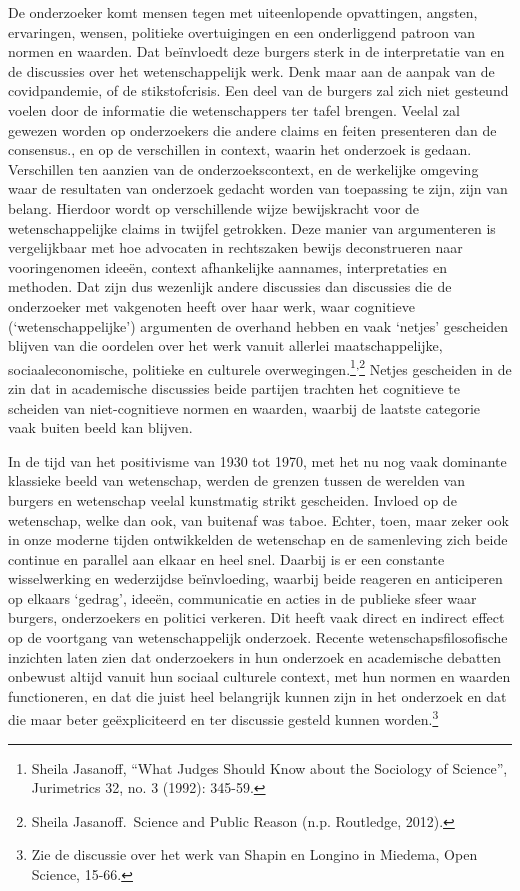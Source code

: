 \documentclass{jote-book}
\begin{document}
	De onderzoeker komt mensen tegen met uiteenlopende opvattingen, angsten, ervaringen, wensen, politieke overtuigingen en een onderliggend patroon van normen en waarden. Dat beïnvloedt deze burgers sterk in de interpretatie van en de discussies over het wetenschappelijk werk. Denk maar aan de aanpak van de covidpandemie, of de stikstofcrisis. Een deel van de burgers zal zich niet gesteund voelen door de informatie die wetenschappers ter tafel brengen. Veelal zal gewezen worden op onderzoekers die andere claims en feiten presenteren dan de consensus., en op de verschillen in context, waarin het onderzoek is gedaan. Verschillen ten aanzien van de onderzoekscontext, en de werkelijke omgeving waar de resultaten van onderzoek gedacht worden van toepassing te zijn, zijn van belang. Hierdoor wordt op verschillende wijze bewijskracht voor de wetenschappelijke claims in twijfel getrokken. Deze manier van argumenteren is vergelijkbaar met hoe advocaten in rechtszaken bewijs deconstrueren naar vooringenomen ideeën, context afhankelijke aannames, interpretaties en methoden. Dat zijn dus wezenlijk andere discussies dan discussies die de onderzoeker met vakgenoten heeft over haar werk, waar cognitieve (‘wetenschappelijke') argumenten de overhand hebben en vaak ‘netjes' gescheiden blijven van die oordelen over het werk vanuit allerlei maatschappelijke, sociaaleconomische, politieke en culturele overwegingen.\footnote{Sheila Jasanoff, “What Judges Should Know about the Sociology of Science”, Jurimetrics 32, no. 3 (1992): 345-59.}\textsuperscript{,}\footnote{Sheila Jasanoff. Science and Public Reason (n.p. Routledge, 2012).} Netjes gescheiden in de zin dat in academische discussies beide partijen trachten het cognitieve te scheiden van niet-cognitieve normen en waarden, waarbij de laatste categorie vaak buiten beeld kan blijven.



	In de tijd van het positivisme van 1930 tot 1970, met het nu nog vaak dominante klassieke beeld van wetenschap, werden de grenzen tussen de werelden van burgers en wetenschap veelal kunstmatig strikt gescheiden. Invloed op de wetenschap, welke dan ook, van buitenaf was taboe. Echter, toen, maar zeker ook in onze moderne tijden ontwikkelden de wetenschap en de samenleving zich beide continue en parallel aan elkaar en heel snel. Daarbij is er een constante wisselwerking en wederzijdse beïnvloeding, waarbij beide reageren en anticiperen op elkaars ‘gedrag', ideeën, communicatie en acties in de publieke sfeer waar burgers, onderzoekers en politici verkeren. Dit heeft vaak direct en indirect effect op de voortgang van wetenschappelijk onderzoek. Recente wetenschapsfilosofische inzichten laten zien dat onderzoekers in hun onderzoek en academische debatten onbewust altijd vanuit hun sociaal culturele context, met hun normen en waarden functioneren, en dat die juist heel belangrijk kunnen zijn in het onderzoek en dat die maar beter geëxpliciteerd en ter discussie gesteld kunnen worden.\footnote{Zie de discussie over het werk van Shapin en Longino in Miedema, Open Science, 15-66.}
\end{document}
